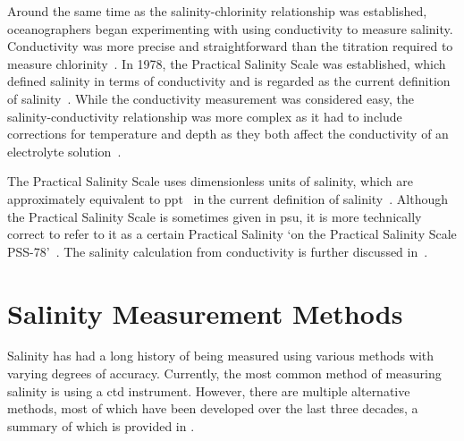 Around the same time as the salinity-chlorinity relationship was established, oceanographers began experimenting with using conductivity to measure salinity.
Conductivity was more precise and straightforward than the titration required to measure chlorinity~\cite{lewis_salinity_definition_and_calculation_1978}.
In 1978, the Practical Salinity Scale was established, which defined salinity in terms of conductivity and is regarded as the current definition of salinity~\cite{lewis_salinity_definition_and_calculation_1978}.
While the conductivity measurement was considered easy, the salinity-conductivity relationship was more complex as it had to include corrections for temperature and depth as they both affect the conductivity of an electrolyte solution~\cite{zheng_electrical_conductivity_of_ocean_2017}.

The Practical Salinity Scale uses dimensionless units of salinity, which are approximately equivalent to \gls{ppt}~\cite{seabird_ppt_vs_psu_2024} in the current definition of salinity~\cite{ioc_teos_2010}.
Although the Practical Salinity Scale is sometimes given in \gls{psu}, it is more technically correct to refer to it as a certain Practical Salinity `on the Practical Salinity Scale PSS-78'~\cite{lewis_salinity_definition_and_calculation_1978}.
The salinity calculation from conductivity is further discussed in~.


\section{Salinity Measurement Methods}\label{sec:salinity-measurement-techniques}

Salinity has had a long history of being measured using various methods with varying degrees of accuracy.
Currently, the most common method of measuring salinity is using a \gls{ctd} instrument. 
However, there are multiple alternative methods, most of which have been developed over the last three decades, a summary of which is provided in .

